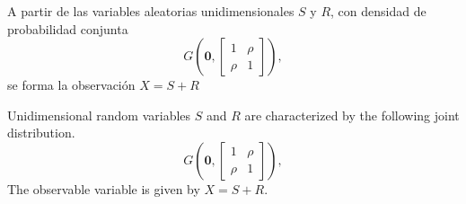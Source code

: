 \ifspanish

\question A partir de las variables aleatorias unidimensionales $S$ y $R$, con densidad de probabilidad conjunta
  $$G\left(\textbf{0}, \left[ \begin{array}{cc} 1 & \rho \\ \rho & 1 \end{array} \right]\right),$$
  se forma la observaci\'{o}n  $X = S+ R$


\begin{solution}
\end{solution}

\else

\question Unidimensional random variables $S$ and $R$ are characterized by the following joint distribution.
  $$
   G\left(\textbf{0}, \left[ \begin{array}{cc} 1 & \rho \\ \rho & 1 \end{array} \right]\right),
  $$
The observable variable is given by $X = S+ R$.

